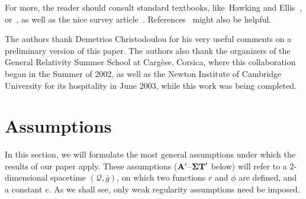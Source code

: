 \documentclass{article}
\begin{document}
For more, the reader should consult
standard textbooks, like~Hawking and Ellis~\cite{he:lssst}, or~\cite{bee:glg}, as well as 
the nice survey article~\cite{chr:givp}. 
References~\cite{md:bb, md:ouggaria} might also be helpful.

\vskip1pc
The authors thank Demetrios Christodoulou
for his very useful comments on a preliminary version of this paper. 
The authors also thank the organizers of the
General Relativity Summer School at Carg\`ese, Corsica,
where this collaboration began in the Summer of 2002, 
as well as the Newton Institute of Cambridge University for its
hospitality in June 2003, while this work was being completed.



\section{Assumptions}
\label{assumsec}
In this section, we will formulate the most general assumptions 
under which the results of our paper apply. These 
assumptions (${\bf A}'$--${\bf \Sigma T}'$ below)
will refer to a $2$-dimensional spacetime $(\mathcal{Q},\bar{g})$,
on which two functions $r$ and $\phi$
are defined, and a constant $e$. 
As we shall see, only weak regularity assumptions
need be imposed. 
\end{document}
